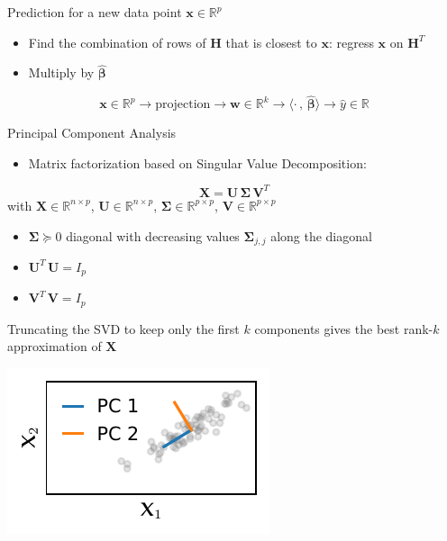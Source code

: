 \documentclass[presentation,mathserif,table]{beamer}
\newcommand{\X}{{\mathbold X}}
\newcommand{\bSigma}{{\mathbold \Sigma}}
\newcommand{\x}{{\mathbold x}}
\newcommand{\bbeta}{{\mathbold \beta}}
\newcommand{\U}{{\mathbold U}}
\newcommand{\V}{{\mathbold V}}
\newcommand{\bH}{{\mathbold H}}
\newcommand{\R}{\mathbb{R}}
\begin{document}
\begin{frame}[label={sec:orgac330c6}]{Prediction for a new data point \(\x \in \R^{p}\)}
\begin{itemize}
\item Find the combination of rows of \(\bH\) that is closest to \(\x\): regress \(\x\) on \(\bH^T\)
\item Multiply by \(\hat{\bbeta}\)
\end{itemize}
    \begin{equation}
\x \in \R^p \rightarrow \text{projection} \rightarrow \mathbold{w} \in \R^k \rightarrow \langle \cdot \, , \, \hat{\bbeta}\rangle \rightarrow \hat{y} \in \R
    \end{equation}
\end{frame}
\begin{frame}[label={sec:org2386c05}]{Principal Component Analysis}
\begin{itemize}
\item Matrix factorization based on Singular Value Decomposition:
\end{itemize}
\begin{equation}
\X = \U \, \bSigma \, \V^T
\end{equation}
with \(\X \in \R^{n \times p}\), \(\U \in \R^{n \times p}\), \(\bSigma \in \R^{p \times p}\), \(\V \in \R^{p \times p}\)
\begin{itemize}
\item \(\bSigma \succeq 0\) diagonal with decreasing values \(\bSigma_{j,j}\) along the diagonal
\item \(\U^T\, \U = I_p\)
\item \(\V^T\, \V = I_p\)
\end{itemize}

Truncating the SVD to keep only the first \(k\) components gives the best rank-\(k\) approximation of \(\X\)
\begin{center}
\includegraphics[height=.3\textheight]{figures/generated/pca/cloud_not_aligned_with_pc.pdf}
\end{center}
\end{frame}
\end{document}
